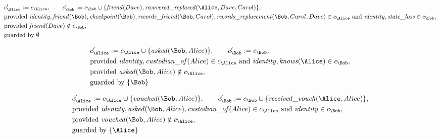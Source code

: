 \begin{align*}
&
c'_
{
\Alice
}
 := 
c_
{
\Alice
}
, \qquad 
c'_
{
\Bob
}
 := 
c_
{
\Bob
}
 \cup 
\{
\mathit{\detokenize{
friend
}}
(
Dave
)
,
\mathit{\detokenize{
recovered_replaced
}}
(
\Alice
,
Dave
,
Carol
)
\}
,\\
&
\text{provided } 
\mathit{\detokenize{
identity
}}
,
\mathit{\detokenize{
friend
}}
(
\Bob
)
,
\mathit{\detokenize{
checkpoint
}}
(
\Bob
)
,
\mathit{\detokenize{
records_friend
}}
(
\Bob
,
Carol
)
,
\mathit{\detokenize{
records_replacement
}}
(
\Bob
,
Carol
,
Dave
)
 \in c_
{
\Alice
}
 \text{ and } 
\mathit{\detokenize{
identity
}}
,
\mathit{\detokenize{
state_loss
}}
 \in c_
{
\Bob
}
,\\
&
\text{provided } 
\mathit{\detokenize{
friend
}}
(
Dave
)
 \notin c_
{
\Bob
}
,\\
&
\text{guarded by } \emptyset
\end{align*}

\begin{align*}
&
c'_
{
\Alice
}
 := 
c_
{
\Alice
}
 \cup 
\{
\mathit{\detokenize{
asked
}}
(
\Bob
,
Alice
)
\}
, \qquad 
c'_
{
\Bob
}
 := 
c_
{
\Bob
}
,\\
&
\text{provided } 
\mathit{\detokenize{
identity
}}
,
\mathit{\detokenize{
custodian_of
}}
(
Alice
)
 \in c_
{
\Alice
}
 \text{ and } 
\mathit{\detokenize{
identity
}}
,
\mathit{\detokenize{
knows
}}
(
\Alice
)
 \in c_
{
\Bob
}
,\\
&
\text{provided } 
\mathit{\detokenize{
asked
}}
(
\Bob
,
Alice
)
 \notin c_
{
\Alice
}
,\\
&
\text{guarded by } \{
\Bob
\}
\end{align*}

\begin{align*}
&
c'_
{
\Alice
}
 := 
c_
{
\Alice
}
 \cup 
\{
\mathit{\detokenize{
vouched
}}
(
\Bob
,
Alice
)
\}
, \qquad 
c'_
{
\Bob
}
 := 
c_
{
\Bob
}
 \cup 
\{
\mathit{\detokenize{
received_vouch
}}
(
\Alice
,
Alice
)
\}
,\\
&
\text{provided } 
\mathit{\detokenize{
identity
}}
,
\mathit{\detokenize{
asked
}}
(
\Bob
,
Alice
)
,
\mathit{\detokenize{
custodian_of
}}
(
Alice
)
 \in c_
{
\Alice
}
 \text{ and } 
\mathit{\detokenize{
identity
}}
 \in c_
{
\Bob
}
,\\
&
\text{provided } 
\mathit{\detokenize{
vouched
}}
(
\Bob
,
Alice
)
 \notin c_
{
\Alice
}
,\\
&
\text{guarded by } \{
\Alice
\}
\end{align*}

